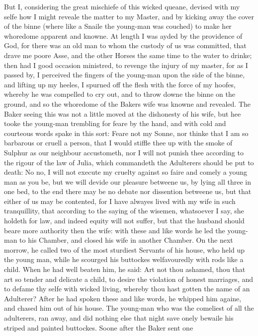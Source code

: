 But I, considering the great mischiefe of this wicked queane, devised with my
selfe how I might reveale the matter to my Master, and by kicking away the
cover of the binne (where like a Snaile the young-man was couched) to make her
whoredome apparent and knowne. At length I was ayded by the providence of God,
for there was an old man to whom the custody of us was committed, that drave me
poore Asse, and the other Horses the same time to the water to drinke; then had
I good occasion ministred, to revenge the injury of my master, for as I passed
by, I perceived the fingers of the young-man upon the side of the binne, and
lifting up my heeles, I spurned off the flesh with the force of my hoofes,
whereby he was compelled to cry out, and to throw downe the binne on the
ground, and so the whoredome of the Bakers wife was knowne and revealed. The
Baker seeing this was not a little moved at the dishonesty of his wife, but hee
tooke the young-man trembling for feare by the hand, and with cold and
courteous words spake in this sort: Feare not my Sonne, nor thinke that I am so
barbarous or cruell a person, that I would stiffle thee up with the smoke of
Sulphur as our neighbour accustometh, nor I will not punish thee according to
the rigour of the law of Julia, which commandeth the Adulterers should be put
to death: No no, I will not execute my cruelty against so faire and comely a
young man as you be, but we will devide our pleasure betweene us, by lying all
three in one bed, to the end there may be no debate nor dissention betweene us,
but that either of us may be contented, for I have alwayes lived with my wife
in such tranquillity, that according to the saying of the wisemen, whatsoever I
say, she holdeth for law, and indeed equity will not suffer, but that the
husband should beare more authority then the wife: with these and like words he
led the young-man to his Chamber, and closed his wife in another Chamber. On
the next morrow, he called two of the most sturdiest Servants of his house, who
held up the young man, while he scourged his buttockes welfavouredly with rods
like a child. When he had well beaten him, he said: Art not thou ashamed, thou
that art so tender and delicate a child, to desire the violation of honest
marriages, and to defame thy selfe with wicked living, whereby thou hast gotten
the name of an Adulterer? After he had spoken these and like words, he whipped
him againe, and chased him out of his house. The young-man who was the
comeliest of all the adulterers, ran away, and did nothing else that night save
onely bewaile his striped and painted buttockes. Soone after the Baker sent one
